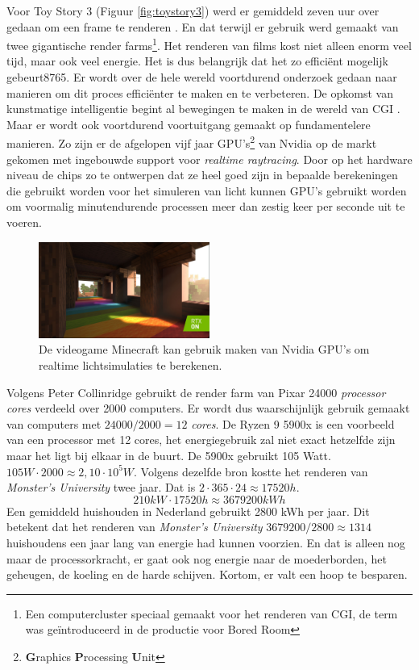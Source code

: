 \documentclass[12pt, a4paper]{article}
\begin{document}
Voor Toy Story 3 (Figuur \ref{fig:toystory3}) werd er gemiddeld zeven uur over gedaan om een frame te renderen \cite{HowToyStory3WasMade}. En dat terwijl er gebruik werd gemaakt van twee gigantische render farms\footnote{Een computercluster speciaal gemaakt voor het renderen van CGI, de term was geïntroduceerd in de productie voor Bored Room\cite{MakingOfBoredRoom}}. Het renderen van films kost niet alleen enorm veel tijd, maar ook veel energie. Het is dus belangrijk dat het zo efficiënt mogelijk gebeurt8765. Er wordt over de hele wereld voortdurend onderzoek gedaan naar manieren om dit proces efficiënter te maken en te verbeteren. De opkomst van kunstmatige intelligentie begint al bewegingen te maken in de wereld van CGI \cite{NeRFactor}. Maar er wordt ook voortdurend voortuitgang gemaakt op fundamentelere manieren. Zo zijn er de afgelopen vijf jaar GPU's\footnote{\textbf{G}raphics \textbf{P}rocessing \textbf{U}nit} van Nvidia op de markt gekomen met ingebouwde support voor \textit{realtime raytracing}\cite{NvidiaRTX}. Door op het hardware niveau de chips zo te ontwerpen dat ze heel goed zijn in bepaalde berekeningen die gebruikt worden voor het simuleren van licht kunnen GPU's gebruikt worden om voormalig minutendurende processen meer dan zestig keer per seconde uit te voeren. 
\begin{figure}[H]
    \centering
    \includegraphics[width=0.5\textwidth]{minecraftrtx.jpg}
    \caption{De videogame Minecraft kan gebruik maken van Nvidia GPU's om realtime lichtsimulaties te berekenen.}
    \label{fig:minecraftrtx}
\end{figure}

Volgens Peter Collinridge\cite{ScienceBehindPixarRendering} gebruikt de render farm van Pixar 24000 \textit{processor cores} verdeeld over 2000 computers. Er wordt dus waarschijnlijk gebruik gemaakt van computers met \(24000/2000=12\) \textit{cores}. De Ryzen 9 5900x is een voorbeeld van een processor met 12 cores, het energiegebruik zal niet exact hetzelfde zijn maar het ligt bij elkaar in de buurt. De 5900x gebruikt 105 Watt. \(105W\cdot 2000\approx 2,10\cdot 10^5W\). Volgens dezelfde bron kostte het renderen van \textit{Monster's University} twee jaar. Dat is \(2\cdot 365\cdot 24\approx17520h\). \[210kW \cdot 17520h\approx 3679200kWh\] Een gemiddeld huishouden in Nederland gebruikt 2800 kWh per jaar\cite{EnergieGebruik}. Dit betekent dat het renderen van \textit{Monster's University} \(3679200/2800\approx 1314\) huishoudens een jaar lang van energie had kunnen voorzien. En dat is alleen nog maar de processorkracht, er gaat ook nog energie naar de moederborden, het geheugen, de koeling en de harde schijven. Kortom, er valt een hoop te besparen.
\clearpage
\end{document}
